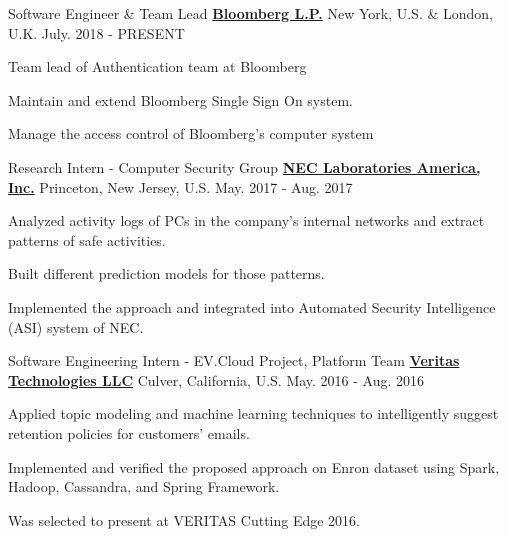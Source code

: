 

\begin{cventries}
\cventry
{Software Engineer \& Team Lead} %
{\href{http://www.bloomberg.com/}{\bf Bloomberg L.P.}}  %
{New York, U.S. \& London, U.K.} %
{July. 2018 - PRESENT} %
{
		\begin{cvitems} %
			\item Team lead of Authentication team at Bloomberg
			\item Maintain and extend Bloomberg Single Sign On system.
			\item Manage the access control of Bloomberg's computer system
		\end{cvitems}
}


\cventry
{Research Intern - Computer Security Group} %
{\href{http://www.nec-labs.com/}{\bf NEC Laboratories America, Inc.}}  %
{Princeton, New Jersey, U.S.} %
{May. 2017 - Aug. 2017} %
{
	\begin{cvitems} %
		\item Analyzed activity logs of PCs in the company's internal networks and extract patterns of safe activities.
		\item Built different prediction models for those patterns.
		\item Implemented the approach and integrated into Automated Security Intelligence (ASI) system of NEC.
	\end{cvitems}
}
	
	
\cventry
{Software Engineering Intern - EV.Cloud Project, Platform Team} %
{\href{https://www.veritas.com/}{\bf Veritas Technologies LLC}}  %
{Culver, California, U.S.} %
{May. 2016 - Aug. 2016} %
{
	\begin{cvitems} %
		\item Applied topic modeling and machine learning techniques to intelligently suggest retention policies for customers' emails.
		\item Implemented and verified the proposed approach on Enron dataset using Spark, Hadoop, Cassandra, and Spring Framework.
		\item Was selected to present at VERITAS Cutting Edge 2016.
	\end{cvitems}
}


\end{cventries}
